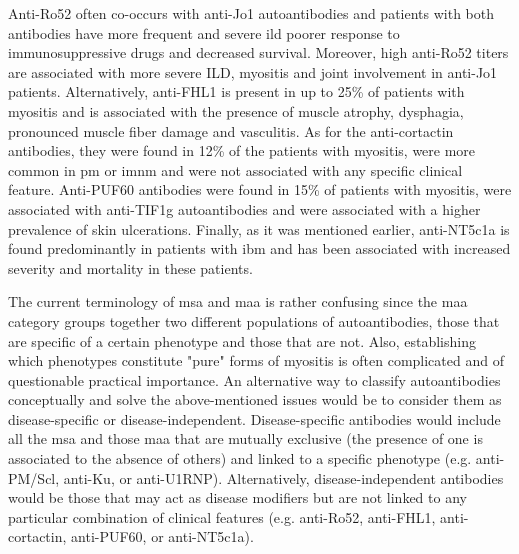 Anti-Ro52 often co-occurs with anti-Jo1 autoantibodies and patients with both antibodies have more frequent and severe \gls{ild} poorer response to immunosuppressive drugs and decreased survival.\cite{PinalFernandez2017a,Vancsa2009,Bauhammer2016,Marie2012} Moreover, high anti-Ro52 titers are associated with more severe ILD, myositis and joint involvement in anti-Jo1 patients.\cite{PinalFernandez2017a,Vancsa2009,Bauhammer2016,Marie2012} Alternatively, anti-FHL1 is present in up to 25\% of patients with myositis and is associated with the presence of muscle atrophy, dysphagia, pronounced muscle fiber damage and vasculitis.\cite{Albrecht2015} As for the anti-cortactin antibodies, they were found in 12\% of the patients with myositis, were more common in \gls{pm} or \gls{imnm} and were not associated with any specific clinical feature.\cite{LabradorHorrillo2014a} Anti-PUF60 antibodies were found in 15\% of patients with myositis, were associated with anti-TIF1g autoantibodies and were associated with a higher prevalence of skin ulcerations.\cite{Fiorentino2016,Zhang2018} Finally, as it was mentioned earlier, anti-NT5c1a is found predominantly in patients with \gls{ibm} and has been associated with increased severity and mortality in these patients.\cite{Lloyd2016,Herbert2016,Muro2017,Lilleker2017,Goyal2016}

The current terminology of \gls{msa} and \gls{maa} is rather confusing since the \gls{maa} category groups together two different populations of autoantibodies, those that are specific of a certain phenotype and those that are not. Also, establishing which phenotypes constitute "pure" forms of myositis is often complicated and of questionable practical importance. An alternative way to classify autoantibodies conceptually and solve the above-mentioned issues would be to consider them as disease-specific or disease-independent. Disease-specific antibodies would include all the \gls{msa} and those \gls{maa} that are mutually exclusive (the presence of one is associated to the absence of others) and linked to a specific phenotype (e.g. anti-PM/Scl, anti-Ku, or anti-U1RNP). Alternatively, disease-independent antibodies would be those that may act as disease modifiers but are not linked to any particular combination of clinical features (e.g. anti-Ro52, anti-FHL1, anti-cortactin, anti-PUF60, or anti-NT5c1a).
